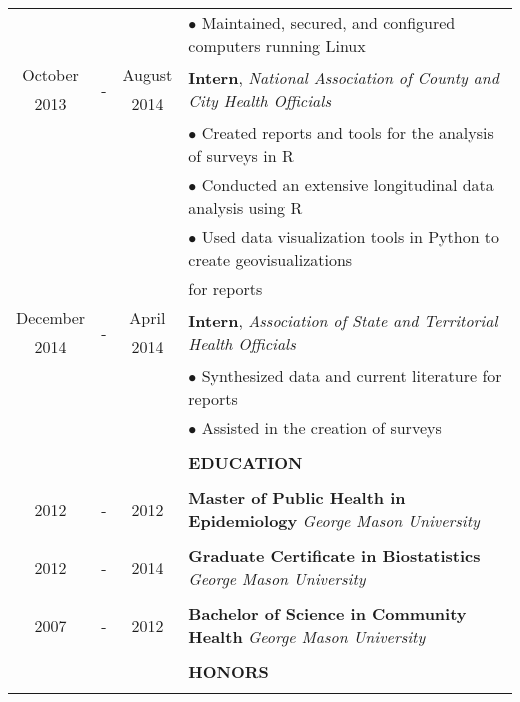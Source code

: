 \documentclass[11pt]{article}
\begin{document}
\begin{table}[ht]
\begin{tabular}{@{\hspace{0mm}}c@{\hspace{1mm}}c@{\hspace{3mm}}cl}
            & & & $\bullet$ Maintained, secured, and configured computers running Linux\\
            October & \multirow{2}{*}{-} & August & \multirow{2}{*}{\textbf{Intern}, \textit{National Association of County and City Health Officials}}\\
            2013 & & 2014 &\\
            & & & $\bullet$ Created reports and tools for the analysis of surveys in R\\
            & & & $\bullet$ Conducted an extensive longitudinal data analysis using R\\
            & & & $\bullet$ Used data visualization tools in Python to create geovisualizations\\
            & & & \hspace*{4mm}for reports\\
            December & \multirow{2}{*}{-} & April & \multirow{2}{*}{\textbf{Intern}, \textit{Association of State and Territorial Health Officials}}\\
            2014 & & 2014 &\\
            & & & $\bullet$ Synthesized data and current literature for reports\\
            & & & $\bullet$ Assisted in the creation of surveys\\
            & & & \color{maroon}{\rule{14cm}{1.1pt}}\\
            & & & \large{\textbf{EDUCATION}}\\
            & & & \color{maroon}{\rule{14cm}{1.1pt}}\\
            2012 & - & 2012 & \textbf{Master of Public Health in Epidemiology} \textit{George Mason University}\\
            \\
            2012 & - & 2014 & \textbf{Graduate Certificate in Biostatistics} \textit{George Mason University}\\
            \\
            2007 & - & 2012 & \textbf{Bachelor of Science in Community Health} \textit{George Mason University}\\
            & & & \color{maroon}{\rule{14cm}{1.1pt}}\\
            & & & \large{\textbf{HONORS}}\\
            & & & \color{maroon}{\rule{14cm}{1.1pt}}\\

\end{tabular}
\end{table}
\end{document}
